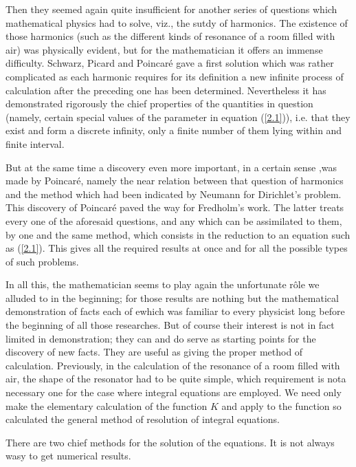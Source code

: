 \documentclass[12pt,oneside]{book}
\begin{document}
Then they seemed again quite insufficient for another series of questions which mathematical physics had to solve, viz., the sutdy of harmonics. The existence of those harmonics (such as the different kinds of resonance of a room filled with air) was physically evident, but for the mathematician it offers an immense difficulty. Schwarz, Picard and Poincar\'e gave a first solution which was rather complicated as each harmonic requires for its definition a new infinite process of calculation after the preceding one has been determined. Nevertheless it has demonstrated rigorously the chief properties of the quantities in question (namely, certain special values of the parameter in equation (\ref{2.1})), i.e. that they exist and form a discrete infinity, only a finite number of them lying within and finite interval. \par

But at the same time a discovery even more important, in a certain sense ,was made by Poincar\'e, namely the near relation between that question of harmonics and the method which had been indicated by Neumann for Dirichlet's problem. This discovery of Poincar\'e paved the way for Fredholm's work. The latter treats every one of the aforesaid questions, and any which can be assimilated to them, by one and the same method, which consists in the reduction to an equation such as (\ref{2.1}). This gives all the required results at once and for all the possible types of such problems. \par

In all this, the mathematician seems to play again the unfortunate r\^ole we alluded to in the beginning; for those results are nothing but the mathematical demonstration of facts each of ewhich was familiar to every physicist long before the beginning of all those researches. But of course their interest is not in fact limited in demonstration; they can and do serve as starting points for the discovery of new facts. They are useful as giving the proper method of calculation. Previously, in the calculation of the resonance of a room filled with air, the shape of the resonator had to be quite simple, which requirement is nota necessary one for the case where integral equations are employed. We need only make the elementary calculation of the function $K$ and apply to the function so calculated the general method of resolution of integral equations. \par

There are two chief methods for the solution of the equations. It is not always wasy to get numerical results. \par
\end{document}
